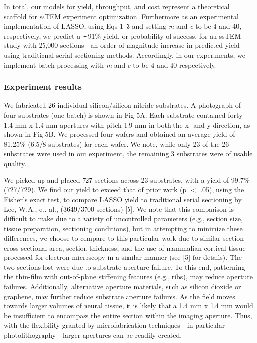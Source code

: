 \documentclass{article}
\begin{document}
In total, our models for yield, throughput, and cost represent a theoretical scaffold for ssTEM experiment optimization. Furthermore as an experimental implementation of LASSO, using Eqs 1–3 and setting \emph{m} and \emph{c} to be 4 and 40, respectively, we predict a ∼91\% yield, or probability of success, for an ssTEM study with 25,000 sections—an order of magnitude increase in predicted yield using traditional serial sectioning methods. Accordingly, in our experiments, we implement batch processing with \emph{m} and \emph{c} to be 4 and 40 respectively.

\subsubsection*{Experiment results}

We fabricated 26 individual silicon/silicon-nitride substrates. A photograph of four substrates (one batch) is shown in Fig 5A. Each substrate contained forty 1.4 mm x 1.4 mm apertures with pitch 1.9 mm in both the x- and y-direction, as shown in Fig 5B. We processed four wafers and obtained an average yield of 81.25\% (6.5/8 substrates) for each wafer. We note, while only 23 of the 26 substrates were used in our experiment, the remaining 3 substrates were of usable quality.

We picked up and placed 727 sections across 23 substrates, with a yield of 99.7\% (727/729). We find our yield to exceed that of prior work (p $<$ .05), using the Fisher’s exact test, to compare LASSO yield to traditional serial sectioning by Lee, W.A., et. al., (3649/3700 sections) [5]. We note that this comparison is difficult to make due to a variety of uncontrolled parameters (e.g., section size, tissue preparation, sectioning conditions), but in attempting to minimize these differences, we choose to compare to this particular work due to similar section cross-sectional area, section thickness, and the use of mammalian cortical tissue processed for electron microscopy in a similar manner (see [5] for details). The two sections lost were due to substrate aperture failure. To this end, patterning the thin-film with out-of-plane stiffening features (e.g., ribs), may reduce aperture failures. Additionally, alternative aperture materials, such as silicon dioxide or graphene, may further reduce substrate aperture failures. As the field moves towards larger volumes of neural tissue, it is likely that a 1.4 mm x 1.4 mm would be insufficient to encompass the entire section within the imaging aperture. Thus, with the flexibility granted by microfabrication techniques—in particular photolithography—larger apertures can be readily created.
\end{document}
